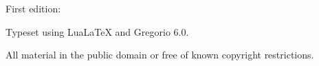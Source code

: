 \documentclass[vespers_book_la_eng.tex]{subfiles}
\begin{document}

\begin{titlepage}
 \begin{center}
\fontsize{40}{50}\selectfont{}


 
 \vfill
{\LARGE{}}
 \end{center}
 
  \begin{center}
{\large{}}
 \end{center}
 
 
 
{}
 {\centering{\capspace{\YEAR}\par}}
\end{titlepage}

\thispagestyle{empty}
%

First edition:

Typeset using Lua\LaTeX{} and Gregorio 6.0.

All material in the public domain or free of known copyright restrictions.


\frontmatter


\mainmatter
\end{document}
